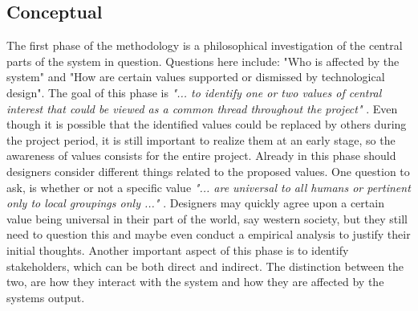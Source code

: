 \subsection{Conceptual}
The first phase of the methodology is a philosophical investigation of the central parts of the system in question. Questions here include: "Who is affected by the system" and "How are certain values supported or dismissed by technological design".\newline 
The goal of this phase is \textit{"... to identify one or two values of central interest that could be viewed as a common thread throughout the project"} \citep[p. 703]{IntegratingEthicsCummings}. Even though it is possible that the identified values could be replaced by others during the project period, it is still important to realize them at an early stage, so the awareness of values consists for the entire project. Already in this phase should designers consider different things related to the proposed values. One question to ask, is whether or not a specific value \textit{"... are universal to all humans or pertinent only to local groupings only ..."} \citep[p. 326]{EmbodyingValues}. Designers may quickly agree upon a certain value being universal in their part of the world, say western society, but they still need to question this and maybe even conduct a empirical analysis to justify their initial thoughts. \newline
Another important aspect of this phase is to identify stakeholders, which can be both direct and indirect. The distinction between the two, are how they interact with the system and how they are affected by the systems output. 


